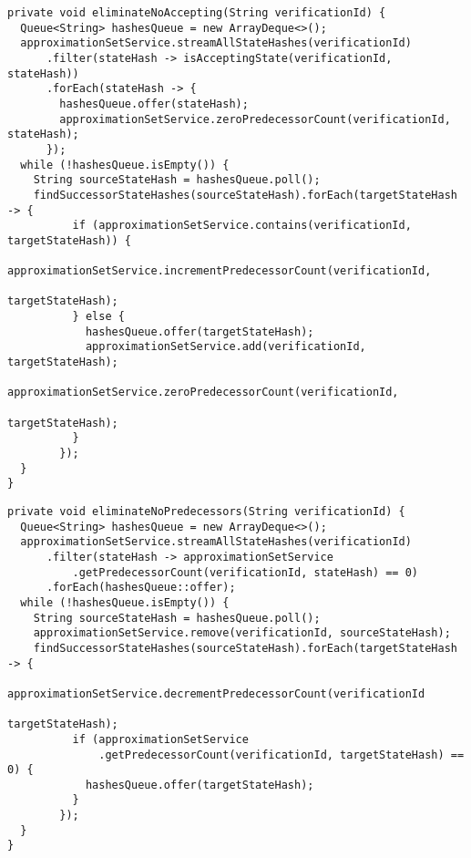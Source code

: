 \begin{minipage}{\linewidth}
\begin{lstlisting}[caption={Implementacja funkcji usuwającej stany nieakceptujące ze zbioru.},captionpos=b,label={lst:eliminateNoAcceptingStates}]
private void eliminateNoAccepting(String verificationId) {
  Queue<String> hashesQueue = new ArrayDeque<>();
  approximationSetService.streamAllStateHashes(verificationId)
      .filter(stateHash -> isAcceptingState(verificationId, stateHash))
      .forEach(stateHash -> {
        hashesQueue.offer(stateHash);
        approximationSetService.zeroPredecessorCount(verificationId, stateHash);
      });
  while (!hashesQueue.isEmpty()) {
    String sourceStateHash = hashesQueue.poll();
    findSuccessorStateHashes(sourceStateHash).forEach(targetStateHash -> {
          if (approximationSetService.contains(verificationId, targetStateHash)) {
            approximationSetService.incrementPredecessorCount(verificationId,
                                                              targetStateHash);
          } else {
            hashesQueue.offer(targetStateHash);
            approximationSetService.add(verificationId, targetStateHash);
            approximationSetService.zeroPredecessorCount(verificationId,
                                                         targetStateHash);
          }
        });
  }
}
\end{lstlisting}
\end{minipage}
\begin{minipage}{\linewidth}
\begin{lstlisting}[caption={Implementacja funkcji usuwającej stany niemające poprzedników ze zbioru.},captionpos=b,label={lst:eliminateNoPredecessorsStates}]
private void eliminateNoPredecessors(String verificationId) {
  Queue<String> hashesQueue = new ArrayDeque<>();
  approximationSetService.streamAllStateHashes(verificationId)
      .filter(stateHash -> approximationSetService
          .getPredecessorCount(verificationId, stateHash) == 0)
      .forEach(hashesQueue::offer);
  while (!hashesQueue.isEmpty()) {
    String sourceStateHash = hashesQueue.poll();
    approximationSetService.remove(verificationId, sourceStateHash);
    findSuccessorStateHashes(sourceStateHash).forEach(targetStateHash -> {
          approximationSetService.decrementPredecessorCount(verificationId
                                                            targetStateHash);
          if (approximationSetService
              .getPredecessorCount(verificationId, targetStateHash) == 0) {
            hashesQueue.offer(targetStateHash);
          }
        });
  }
}
\end{lstlisting}
\end{minipage}

